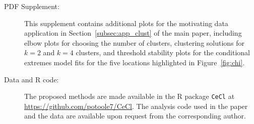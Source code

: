 \documentclass[12pt,compact]{article}
\begin{document}
\begin{description}

  \item[PDF Supplement:] This supplement contains additional plots for the motivating data application in Section~\ref{subsec:app_clust} of the main paper, including elbow plots for choosing the number of clusters, clustering solutions for $k=2$ and $k=4$ clusters, and threshold stability plots for the conditional extremes model fits for the five locations highlighted in Figure~\ref{fig:chi}.

  \item[Data and R code:] The proposed methods are made available in the R package \texttt{CeCl} at \url{https://github.com/potoole7/CeCl}. 
    The analysis code used in the paper and the data are available upon request from the corresponding author.

\end{description}


{\small


}

\clearpage
\end{document}
